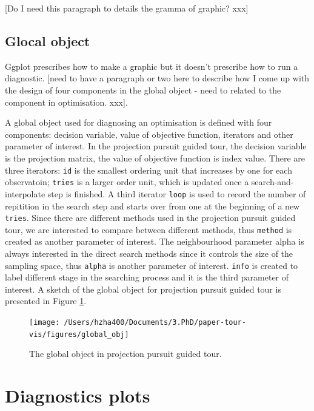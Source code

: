 \documentclass[12pt]{article}
\begin{document}
{[}Do I need this paragraph to details the gramma of graphic? xxx{]}

\hypertarget{glocal-object}{%
\subsection{Glocal object}\label{glocal-object}}

Ggplot prescribes how to make a graphic but it doesn't prescribe how to
run a diagnostic. {[}need to have a paragraph or two here to describe
how I come up with the design of four components in the global object -
need to related to the component in optimisation. xxx{]}.

A global object used for diagnosing an optimisation is defined with four
components: decision variable, value of objective function, iterators
and other parameter of interest. In the projection pursuit guided tour,
the decision variable is the projection matrix, the value of objective
function is index value. There are three iterators: \texttt{id} is the
smallest ordering unit that increases by one for each observatoin;
\texttt{tries} is a larger order unit, which is updated once a
search-and-interpolate step is finished. A third iterator \texttt{loop}
is used to record the number of repitition in the search step and starts
over from one at the beginning of a new \texttt{tries}. Since there are
different methods used in the projection pursuit guided tour, we are
interested to compare between different methods, thus \texttt{method} is
created as another parameter of interest. The neighbourhood parameter
alpha is always interested in the direct search methods since it
controls the size of the sampling space, thus \texttt{alpha} is another
parameter of interest. \texttt{info} is created to label different stage
in the searching process and it is the third parameter of interest. A
sketch of the global object for projection pursuit guided tour is
presented in Figure \ref{fig:glb-obj}.

\begin{figure}
\texttt{[image: /Users/hzha400/Documents/3.PhD/paper-tour-vis/figures/global\_obj]} \caption{\label{glb-obj}The global object in projection pursuit guided tour.}\label{fig:glb-obj}
\end{figure}

\hypertarget{diagnostics-plots}{%
\section{Diagnostics plots}\label{diagnostics-plots}}
\end{document}
